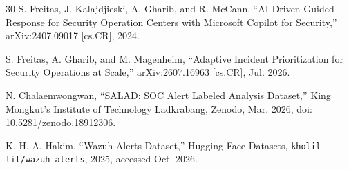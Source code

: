 \documentclass[conference]{IEEEtran}
\begin{document}
\begin{thebibliography}{30}
 S. Freitas, J. Kalajdjieski, A. Gharib, and R. McCann, ``AI-Driven Guided Response for Security Operation Centers with Microsoft Copilot for Security,'' arXiv:2407.09017 [cs.CR], 2024.

 S. Freitas, A. Gharib, and M. Magenheim, ``Adaptive Incident Prioritization for Security Operations at Scale,'' arXiv:2607.16963 [cs.CR], Jul. 2026.

 N. Chalaemwongwan, ``SALAD: SOC Alert Labeled Analysis Dataset,'' King Mongkut's Institute of Technology Ladkrabang, Zenodo, Mar. 2026, doi: 10.5281/zenodo.18912306.

 K. H. A. Hakim, ``Wazuh Alerts Dataset,'' Hugging Face Datasets, \texttt{kholil-lil/wazuh-alerts}, 2025, accessed Oct. 2026.

\end{thebibliography}
\end{document}
